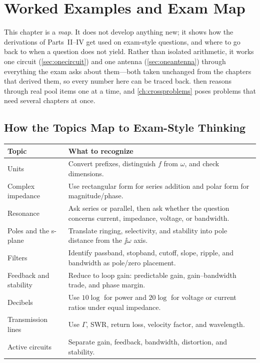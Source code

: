 \chapter{Worked Examples and Exam Map}
\label{ch:exammap}
This chapter is a \emph{map}. It does not develop anything new; it shows how the
derivations of Parts~II--IV get used on exam-style questions, and where to go back to
when a question does not yield. Rather than isolated arithmetic, it works one circuit
(\cref{sec:onecircuit}) and one antenna (\cref{sec:oneantenna}) through everything the
exam asks about them---both taken unchanged from the chapters that derived them, so
every number here can be traced back.  then reasons through real pool items
one at a time, and \cref{ch:crossproblems} poses problems that need several chapters at
once.

\section{How the Topics Map to Exam-Style Thinking}
\begin{tabularx}{\textwidth}{@{}L{0.24\textwidth}Y@{}}
\toprule
Topic & What to recognize \\
\midrule
Units & Convert prefixes, distinguish \(f\) from \(\omega\), and check dimensions. \\
Complex impedance & Use rectangular form for series addition and polar form for magnitude/phase. \\
Resonance & Ask series or parallel, then ask whether the question concerns current, impedance, voltage, or bandwidth. \\
Poles and the s-plane & Translate ringing, selectivity, and stability into pole distance from the \(\jj\omega\) axis. \\
Filters & Identify passband, stopband, cutoff, slope, ripple, and bandwidth as pole/zero placement. \\
Feedback and stability & Reduce to loop gain: predictable gain, gain--bandwidth trade, and phase margin. \\
Decibels & Use \(10\log\) for power and \(20\log\) for voltage or current ratios under equal impedance. \\
Transmission lines & Use \(\Gamma\), SWR, return loss, velocity factor, and wavelength. \\
Active circuits & Separate gain, feedback, bandwidth, distortion, and stability. \\
\bottomrule
\end{tabularx}

